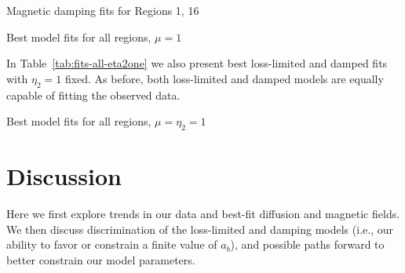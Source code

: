 \documentclass[iop, apj, numberedappendix]{emulateapj}
\begin{document}
\begin{table}
    \scriptsize
    \centering
    \caption{Magnetic damping fits for Regions 1, 16
    \label{tab:fits-damp}}
    
\end{table}

\begin{table}
    \iftoggle{manuscript}{
        \scriptsize
    }{
        \tiny
    }
    \centering
    \caption{Best model fits for all regions, $\mu = 1$
    \label{tab:fits-all}}
    
\end{table}

In Table~\ref{tab:fits-all-eta2one} we also present best loss-limited and
damped fits with $\eta_2 = 1$ fixed.  As before, both loss-limited and damped
models are equally capable of fitting the observed data.

\begin{table}
    \scriptsize
    \centering
    \caption{Best model fits for all regions, $\mu = \eta_2 = 1$
    \label{tab:fits-all-eta2one}}
    
\end{table}


\section{Discussion}

Here we first explore trends in our data and best-fit diffusion and magnetic
fields.  We then discuss discrimination of the loss-limited and damping models
(i.e., our ability to favor or constrain a finite value of $a_b$), and possible
paths forward to better constrain our model parameters.
\end{document}
